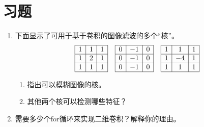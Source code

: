 \section*{习题}\small
\begin{enumerate}

\item 下面显示了可用于基于卷积的图像滤波的多个“核”。
\begin{equation}
\nonumber
\begin{array}{|c|c|c|}
\hline
1 & 1 & 1\\
\hline
1 & 2 & 1\\
\hline
1 & 1 & 1\\
\hline
\end{array}
\quad
\begin{array}{|c|c|c|}
\hline
0 & -1 & 0\\
\hline
0 & -1 & 0\\
\hline
0 & -1 & 0\\
\hline
\end{array}
\quad
\begin{array}{|c|c|c|}
\hline
1 & 1 & 1\\
\hline
1 & -4 & 1\\
\hline
1 & 1 & 1\\
\hline
\end{array}
\end{equation}

\begin{enumerate}

\item 指出可以模糊图像的核。
\item 其他两个核可以检测哪些特征？
\end{enumerate}

\item 需要多少个for循环来实现二维卷积？解释你的理由。
\end{enumerate} \normalsize